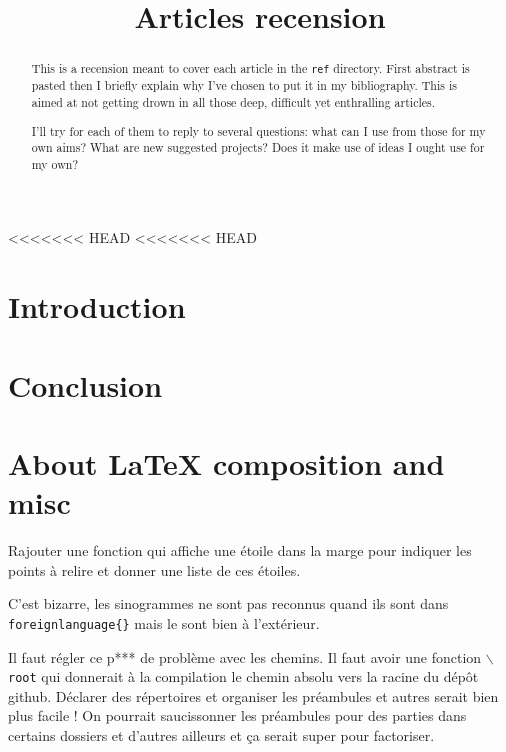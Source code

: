 \documentclass[12pt,onecolumn]{article} %
\title{Articles recension}
\author{}
\begin{document}
\maketitle
{}
\begin{abstract}
\par This is a recension meant to cover each article in the \texttt{ref} directory. First abstract is pasted then I briefly explain why I've chosen to put it in my bibliography. This is aimed at not getting drown in all those deep, difficult yet enthralling articles.\par I'll try for each of them to reply to several questions: what can I use from those for my own aims? What are new suggested projects? Does it make use of ideas I ought use for my own?
\end{abstract}
<<<<<<< HEAD
<<<<<<< HEAD

\tableofcontents
\cleardoublepage

\section*{Introduction}

\section{}


\section*{Conclusion}

\section*{About \LaTeX{} composition and misc}
Rajouter une fonction qui affiche une étoile dans la marge pour indiquer les points à relire et donner une liste de ces étoiles.

C'est bizarre, les sinogrammes ne sont pas reconnus quand ils sont dans \texttt{foreignlanguage\{\}} mais le sont bien à l'extérieur.

Il faut régler ce p*** de problème avec les chemins. Il faut avoir une fonction \texttt{$\backslash$root} qui donnerait à la compilation le chemin absolu vers la racine du dépôt github. Déclarer des répertoires et organiser les préambules et autres serait bien plus facile ! On pourrait saucissonner les préambules pour des parties dans certains dossiers et d'autres ailleurs et ça serait super pour factoriser.
\end{document}
